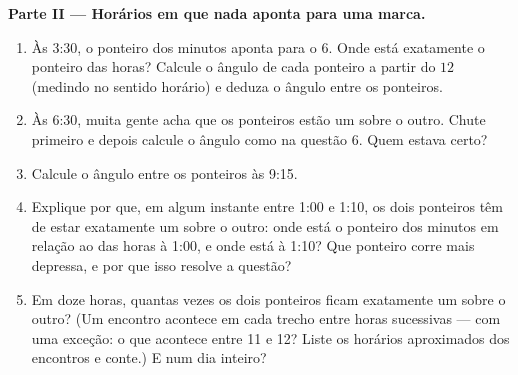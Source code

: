 \begin{problem}
\medskip
\noindent\textbf{Parte II --- Horários em que nada aponta para uma
marca.}
\begin{enumerate}[resume]
  \item Às 3:30, o ponteiro dos minutos aponta para o $6$. Onde está
        exatamente o ponteiro das horas? Calcule o ângulo de cada
        ponteiro a partir do $12$ (medindo no sentido horário) e deduza
        o ângulo entre os ponteiros.
  \item Às 6:30, muita gente acha que os ponteiros estão um sobre o
        outro. Chute primeiro e depois calcule o ângulo como na questão
        6. Quem estava certo?
  \item Calcule o ângulo entre os ponteiros às 9:15.
  \item Explique por que, em algum instante entre 1:00 e 1:10, os dois
        ponteiros têm de estar exatamente um sobre o outro: onde está o
        ponteiro dos minutos em relação ao das horas à 1:00, e onde
        está à 1:10? Que ponteiro corre mais depressa, e por que isso
        resolve a questão?
  \item Em doze horas, quantas vezes os dois ponteiros ficam exatamente
        um sobre o outro? (Um encontro acontece em cada trecho entre
        horas sucessivas --- com uma exceção: o que acontece entre 11 e
        12? Liste os horários aproximados dos encontros e conte.) E num
        dia inteiro?
\end{enumerate}


\end{problem}
